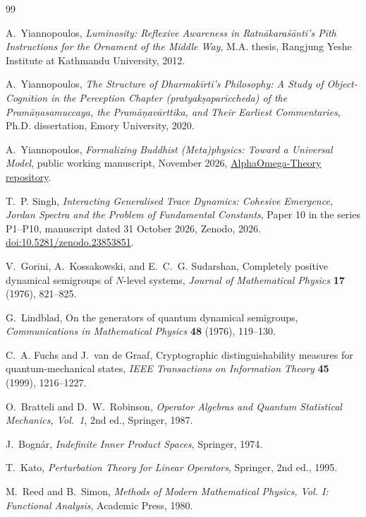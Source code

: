 \documentclass[11pt,reqno]{scrartcl}
\theoremstyle{plain}
\theoremstyle{definition}
\theoremstyle{remark}
\begin{document}
\bigskip
\begin{thebibliography}{99}

A.~Yiannopoulos,
\emph{Luminosity: Reflexive Awareness in Ratn\=akara\'s\=anti's Pith
Instructions for the Ornament of the Middle Way},
M.A. thesis, Rangjung Yeshe Institute at Kathmandu University, 2012.

A.~Yiannopoulos,
\emph{The Structure of Dharmak\=irti's Philosophy: A Study of
Object-Cognition in the Perception Chapter (pratyak\d{s}apariccheda) of the
Pram\=a\d{n}asamuccaya, the Pram\=a\d{n}av\=arttika, and Their Earliest
Commentaries},
Ph.D. dissertation, Emory University, 2020.

A.~Yiannopoulos,
\emph{Formalizing Buddhist (Meta)physics: Toward a Universal Model},
public working manuscript, November 2026,
\href{https://github.com/AlphaOmega-Institute/AlphaOmega-Theory/blob/main/manuscripts/taum/Toward_a_Universal_Model_Self_Contained.tex}
{AlphaOmega-Theory repository}.

T.~P. Singh,
\emph{Interacting Generalised Trace Dynamics: Cohesive Emergence, Jordan
Spectra and the Problem of Fundamental Constants},
Paper 10 in the series P1--P10, manuscript dated 31 October 2026,
Zenodo, 2026.
\href{https://doi.org/10.5281/zenodo.23853851}{doi:10.5281/zenodo.23853851}.

V.~Gorini, A.~Kossakowski, and E.~C.~G. Sudarshan,
Completely positive dynamical semigroups of $N$-level systems,
\emph{Journal of Mathematical Physics} \textbf{17} (1976), 821--825.

G.~Lindblad,
On the generators of quantum dynamical semigroups,
\emph{Communications in Mathematical Physics} \textbf{48} (1976), 119--130.

C.~A. Fuchs and J.~van de Graaf,
Cryptographic distinguishability measures for quantum-mechanical states,
\emph{IEEE Transactions on Information Theory} \textbf{45} (1999), 1216--1227.

O.~Bratteli and D.~W.~Robinson,
\emph{Operator Algebras and Quantum Statistical Mechanics, Vol.~1},
2nd ed., Springer, 1987.

J.~Bogn\'ar,
\emph{Indefinite Inner Product Spaces},
Springer, 1974.

T.~Kato,
\emph{Perturbation Theory for Linear Operators},
Springer, 2nd ed., 1995.

M.~Reed and B.~Simon,
\emph{Methods of Modern Mathematical Physics, Vol. I: Functional Analysis},
Academic Press, 1980.

\end{thebibliography}
\end{document}
